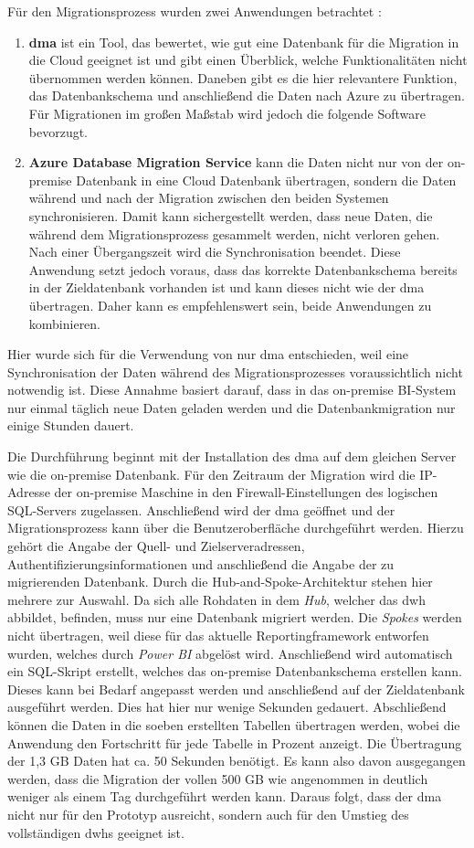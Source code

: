 Für den Migrationsprozess wurden zwei Anwendungen betrachtet \cite{soh_microsoft_2020}: 
\begin{enumerate}
\item \textbf{\ac{dma}} ist ein Tool, das bewertet, wie gut eine Datenbank für die Migration in die Cloud geeignet ist und gibt einen Überblick, welche Funktionalitäten nicht übernommen werden können. Daneben gibt es die hier relevantere Funktion, das Datenbankschema und anschließend die Daten nach Azure zu übertragen. Für Migrationen im großen Maßstab wird jedoch die folgende Software bevorzugt. 
\item \textbf{Azure Database Migration Service} kann die Daten nicht nur von der on-premise Datenbank in eine Cloud Datenbank übertragen, sondern die Daten während und nach der Migration zwischen den beiden Systemen synchronisieren. Damit kann sichergestellt werden, dass neue Daten, die während dem Migrationsprozess gesammelt werden, nicht verloren gehen. Nach einer Übergangszeit wird die Synchronisation beendet. Diese Anwendung setzt jedoch voraus, dass das korrekte Datenbankschema bereits in der Zieldatenbank vorhanden ist und kann dieses nicht wie der \ac{dma} übertragen. Daher kann es empfehlenswert sein, beide Anwendungen zu kombinieren.
\end{enumerate}
Hier wurde sich für die Verwendung von nur \ac{dma} entschieden, weil eine Synchronisation der Daten während des Migrationsprozesses voraussichtlich nicht notwendig ist. Diese Annahme basiert darauf, dass in das on-premise BI-System nur einmal täglich neue Daten geladen werden und die Datenbankmigration nur einige Stunden dauert.

Die Durchführung beginnt mit der Installation des \ac{dma} auf dem gleichen Server wie die on-premise Datenbank. Für den Zeitraum der Migration wird die IP-Adresse der on-premise Maschine in den Firewall-Einstellungen des logischen SQL-Servers zugelassen. Anschließend wird der \ac{dma} geöffnet und der Migrationsprozess kann über die Benutzeroberfläche durchgeführt werden. Hierzu gehört die Angabe der Quell- und Zielserveradressen, Authentifizierungsinformationen und anschließend die Angabe der zu migrierenden Datenbank. Durch die Hub-and-Spoke-Architektur stehen hier mehrere zur Auswahl. Da sich alle Rohdaten in dem \textit{Hub}, welcher das \ac{dwh} abbildet, befinden, muss nur eine Datenbank migriert werden. Die \textit{Spokes} werden nicht übertragen, weil diese für das aktuelle Reportingframework entworfen wurden, welches durch \textit{Power BI} abgelöst wird. Anschließend wird automatisch ein SQL-Skript erstellt, welches das on-premise Datenbankschema erstellen kann. Dieses kann bei Bedarf angepasst werden und anschließend auf der Zieldatenbank ausgeführt werden. Dies hat hier nur wenige Sekunden gedauert. Abschließend können die Daten in die soeben erstellten Tabellen übertragen werden, wobei die Anwendung den Fortschritt für jede Tabelle in Prozent anzeigt. Die Übertragung der 1,3 GB Daten hat ca. 50 Sekunden benötigt. Es kann also davon ausgegangen werden, dass die Migration der vollen 500 GB wie angenommen in deutlich weniger als einem Tag durchgeführt werden kann. Daraus folgt, dass der \ac{dma} nicht nur für den Prototyp ausreicht, sondern auch für den Umstieg des vollständigen \acp{dwh} geeignet ist.

